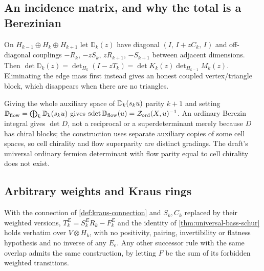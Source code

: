 \subsection{An incidence matrix, and why the total is a Berezinian}
\begin{theorem}
\label{thm:incidence-two-schur}
On $H_{k-1}\oplus H_k\oplus H_{k+1}$ let $\mathbb D_k(z)$ have diagonal
$(I,\,I+zC_k,\,I)$ and off-diagonal couplings $-R_k$, $-zS_k$, $zR_{k+1}$,
$-S_{k+1}$ between adjacent dimensions. Then
$\det\mathbb D_k(z) = \det_{H_k}(I-zT_k) = \det K_k(z)\det_{H_{k-1}}M_k(z)$.
Eliminating the edge mass first instead gives an honest coupled
vertex/triangle block, which disappears when there are no triangles.
\end{theorem}

\begin{theorem}
\label{thm:berezinian-total}
Giving the whole auxiliary space of $\mathbb D_k(s_ku)$ parity $k+1$ and
setting $\mathbb D_{\mathrm{flow}} = \bigoplus_k\mathbb D_k(s_ku)$ gives
$\operatorname{sdet}\mathbb D_{\mathrm{flow}}(u) = \mathcal Z_{\mathrm{ord}}(X,u)^{-1}$. An
ordinary Berezin integral gives $\det D$, not a reciprocal or a superdeterminant
merely because $D$ has chiral blocks; the construction uses separate auxiliary
copies of some cell spaces, so cell chirality and flow superparity are distinct
gradings. The draft's universal ordinary fermion determinant with flow parity
equal to cell chirality does not exist.
\end{theorem}

\subsection{Arbitrary weights and Kraus rings}
\begin{theorem}
\label{thm:twisted-bass-schur}
With the connection of \cref{def:kraus-connection} and $S_k,C_k$ replaced by
their weighted versions, $T^E_k = S^E_kR_k-F^E_k$ and the identity of
\cref{thm:universal-bass-schur} holds verbatim over $V\otimes H_k$, with no
positivity, pairing, invertibility or flatness hypothesis and no inverse of any
$E_e$. Any other successor rule with the same overlap admits the same
construction, by letting $F$ be the sum of its forbidden weighted transitions.
\end{theorem}

